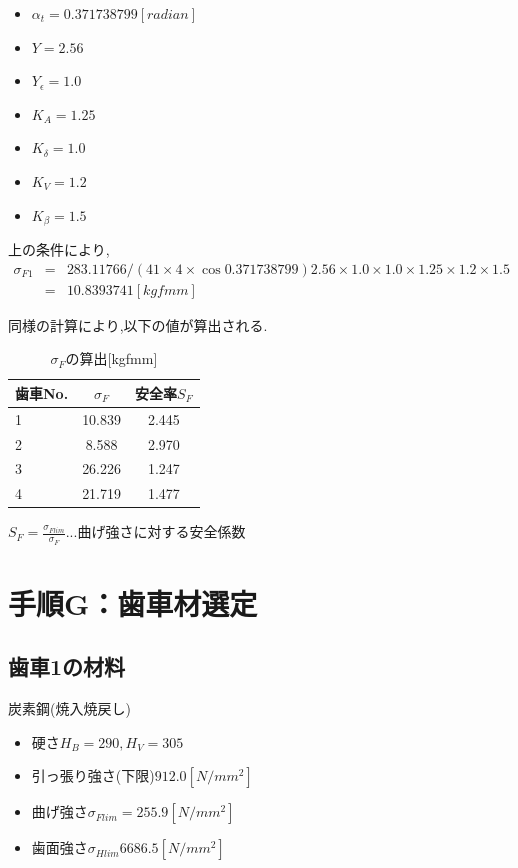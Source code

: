 \documentclass[a4j,twoside,openright,11pt]{jreport}
\begin{document}
\begin{itemize}
\item $\alpha_t=0.371738799[radian]$
\item $Y=2.56$
\item $Y_{\epsilon}=1.0$
\item $K_A=1.25$
\item $K_{\delta}=1.0$
\item $K_V=1.2$
\item $K_{\beta}=1.5$
\end{itemize}
上の条件により,
\begin{eqnarray}
\sigma_{F1}&=&283.11766/(41\times4\times\cos{0.371738799}) 2.56 \times 1.0 \times 1.0 \times 1.25 \times 1.2 \times 1.5\nonumber\\
&=&10.8393741 [kgfmm]\nonumber
\end{eqnarray}

同様の計算により,以下の値が算出される.

\begin{table}[htb]
\begin{center}
  \caption{$\sigma_F$の算出[kgfmm]}
  \begin{tabular}{|l|c|c|} \hline
    歯車No.     &$\sigma_F$ &安全率$S_F$\\\hline
    1           &10.839 &2.445\\
    2           & 8.588 &2.970\\
    3           &26.226 &1.247\\
    4           &21.719 &1.477\\
    \hline
  \end{tabular}
\end{center}
\end{table}
$S_F=\frac{\sigma_{Flim}}{\sigma_{F}}...曲げ強さに対する安全係数$\\

\section{手順G：歯車材選定}
\subsection{歯車1の材料}
炭素鋼(焼入焼戻し)
\begin{itemize}
\item 硬さ$ H_B = 290,H_V=305$
\item 引っ張り強さ(下限)$912.0[N/mm^2]$
\item 曲げ強さ$\sigma_{Flim}=255.9[N/mm^2]$
\item 歯面強さ$\sigma_{Hlim}6686.5[N/mm^2]$
\end{itemize}
\end{document}
